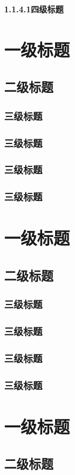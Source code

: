 \documentclass[]{article}
\begin{document}
		\noindent \textbf{1.1.4.1四级标题}
		
			 \newpage
		\section{一级标题}
		\subsection{二级标题}
		\subsubsection{三级标题}
		\subsubsection{三级标题}
		\subsubsection{三级标题}
		\subsubsection{三级标题}
			 \newpage
		\section{一级标题}
		\subsection{二级标题}
		\subsubsection{三级标题}
		\subsubsection{三级标题}
		\subsubsection{三级标题}
		\subsubsection{三级标题}
			 \newpage
		\section{一级标题}
		\subsection{二级标题}
\end{document}
